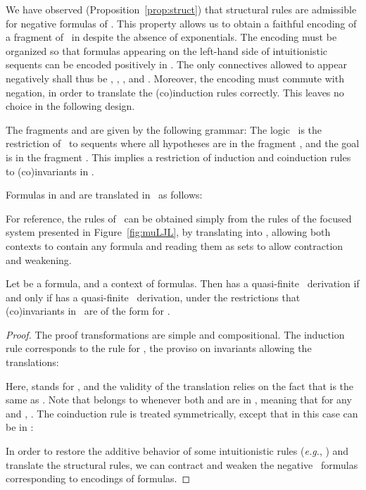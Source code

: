 We have observed (Proposition~\ref{prop:struct}) that structural rules are 
admissible for negative formulas of \mumall.
This property allows us to obtain a 
faithful encoding of a fragment of \muLJ\ in \mumall{}
despite the absence of exponentials.
The encoding must be organized so that formulas appearing on
the left-hand side of intuitionistic sequents can be encoded positively
in \mumall.
The only connectives allowed to appear negatively shall thus be
, , ,  and .
Moreover, the encoding must commute with negation,
in order to translate the (co)induction rules correctly.
This leaves no choice in the following design.

\begin{definition}[, , \muLJL]
The fragments  and  are given by the following grammar:
{\allowdisplaybreaks}
The logic \muLJL\ is the restriction of \muLJ\ to sequents
where all hypotheses are in the fragment ,
and the goal is in the fragment .
This implies a restriction of induction and coinduction rules to
(co)invariants in .

Formulas in  and  are translated in \mumall\ as follows:

\end{definition}



For reference, the rules of \muLJL\ can be obtained simply from
the rules of the focused system presented in Figure~\ref{fig:muLJL},
by translating  into ,
allowing both contexts to contain any  formula
and reading them as sets to allow contraction and weakening.

\begin{proposition} \label{prop:01}
Let  be a  formula, and  a context of  formulas.
Then  has a quasi-finite \muLJL\ derivation if and only if
 has a quasi-finite \mumall\ derivation,
under the restrictions that (co)invariants
in \mumall\ are of the form  for .
\end{proposition}

\begin{proof}
The proof transformations are simple and compositional.
The induction rule corresponds to the  rule for ,
the proviso on invariants allowing the translations:

Here,  stands for ,
and the validity of the translation relies on the fact that
 is the same as .
Note that  belongs to  whenever both  and  are in ,
meaning that for any  and , .
The coinduction rule is treated symmetrically,
except that in this case  can be in :

In order to restore the additive behavior of some intuitionistic
rules (\emph{e.g.}, ) and translate the structural rules,
we can contract and weaken the negative \mumall\ formulas corresponding
to encodings of  formulas.
\end{proof}

